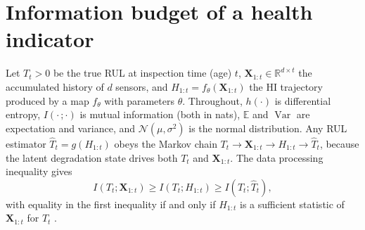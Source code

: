 \documentclass[preprint,12pt]{elsarticle}
\theoremstyle{definition}
\newcommand{\E}{\mathbb{E}}
\DeclareMathOperator{\Var}{Var}
\begin{document}
\section{Information budget of a health indicator}
\label{sec:limits}
Let $T_t>0$ be the true RUL at inspection time (age) $t$, $\mathbf{X}_{1:t}\in\mathbb{R}^{d\times t}$ the accumulated history of $d$ sensors, and $H_{1:t}=f_\theta(\mathbf{X}_{1:t})$ the HI trajectory produced by a map $f_\theta$ with parameters $\theta$. Throughout, $h(\cdot)$ is differential entropy, $I(\cdot\,;\cdot)$ is mutual information (both in nats), $\E$ and $\Var$ are expectation and variance, and $\mathcal N(\mu,\sigma^2)$ is the normal distribution. Any RUL estimator $\hat T_t=g(H_{1:t})$ obeys the Markov chain $T_t \to \mathbf{X}_{1:t}\to H_{1:t}\to \hat T_t$, because the latent degradation state drives both $T_t$ and $\mathbf{X}_{1:t}$. The data processing inequality \cite[Sect.~2.8]{cover2006} gives
\begin{equation}
I(T_t;\mathbf{X}_{1:t}) \ge I(T_t;H_{1:t}) \ge I(T_t;\hat T_t),
\label{eq:dpi}
\end{equation}
with equality in the first inequality if and only if $H_{1:t}$ is a sufficient statistic of $\mathbf{X}_{1:t}$ for $T_t$ \cite[Sect.~2.9]{cover2006}.
\end{document}
